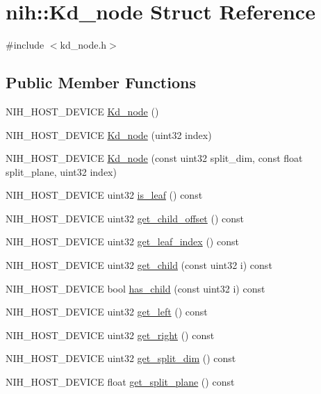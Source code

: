 \hypertarget{structnih_1_1_kd__node}{
\section{nih\-:\-:\-Kd\-\_\-node \-Struct \-Reference}
\label{structnih_1_1_kd__node}
}


{\ttfamily \#include $<$kd\-\_\-node.\-h$>$}

\subsection*{\-Public \-Member \-Functions}
\begin{DoxyCompactItemize}
\item 
\-N\-I\-H\-\_\-\-H\-O\-S\-T\-\_\-\-D\-E\-V\-I\-C\-E \hyperlink{structnih_1_1_kd__node_a2149c53ad7cc826957f69cc02e3ab09f}{\-Kd\-\_\-node} ()
\item 
\-N\-I\-H\-\_\-\-H\-O\-S\-T\-\_\-\-D\-E\-V\-I\-C\-E \hyperlink{structnih_1_1_kd__node_a1829b381799c337fcca40dba470f3e7f}{\-Kd\-\_\-node} (uint32 index)
\item 
\-N\-I\-H\-\_\-\-H\-O\-S\-T\-\_\-\-D\-E\-V\-I\-C\-E \hyperlink{structnih_1_1_kd__node_a2111cebdc9346b36aff1c9d5fbe7d735}{\-Kd\-\_\-node} (const uint32 split\-\_\-dim, const float split\-\_\-plane, uint32 index)
\item 
\-N\-I\-H\-\_\-\-H\-O\-S\-T\-\_\-\-D\-E\-V\-I\-C\-E uint32 \hyperlink{structnih_1_1_kd__node_a25619b385e5688f1016f2959d35653df}{is\-\_\-leaf} () const 
\item 
\-N\-I\-H\-\_\-\-H\-O\-S\-T\-\_\-\-D\-E\-V\-I\-C\-E uint32 \hyperlink{structnih_1_1_kd__node_a119a19feb6758c6b1259e65d9976cc67}{get\-\_\-child\-\_\-offset} () const 
\item 
\-N\-I\-H\-\_\-\-H\-O\-S\-T\-\_\-\-D\-E\-V\-I\-C\-E uint32 \hyperlink{structnih_1_1_kd__node_a9168dcc8e7e8357edbf5fbfea0a665f7}{get\-\_\-leaf\-\_\-index} () const 
\item 
\-N\-I\-H\-\_\-\-H\-O\-S\-T\-\_\-\-D\-E\-V\-I\-C\-E uint32 \hyperlink{structnih_1_1_kd__node_aa4c26fb83061a5527300444cc3d60f58}{get\-\_\-child} (const uint32 i) const 
\item 
\-N\-I\-H\-\_\-\-H\-O\-S\-T\-\_\-\-D\-E\-V\-I\-C\-E bool \hyperlink{structnih_1_1_kd__node_adef1d7ddfa71dda74749f2b516a2d01b}{has\-\_\-child} (const uint32 i) const 
\item 
\-N\-I\-H\-\_\-\-H\-O\-S\-T\-\_\-\-D\-E\-V\-I\-C\-E uint32 \hyperlink{structnih_1_1_kd__node_ae4206521a0b72d8e780dc0cfd68d6a9d}{get\-\_\-left} () const 
\item 
\-N\-I\-H\-\_\-\-H\-O\-S\-T\-\_\-\-D\-E\-V\-I\-C\-E uint32 \hyperlink{structnih_1_1_kd__node_a455e441bda3ae8cef4de37478fd1d911}{get\-\_\-right} () const 
\item 
\-N\-I\-H\-\_\-\-H\-O\-S\-T\-\_\-\-D\-E\-V\-I\-C\-E uint32 \hyperlink{structnih_1_1_kd__node_a0606ab5dcae48dc967ec02944603c90f}{get\-\_\-split\-\_\-dim} () const 
\item 
\-N\-I\-H\-\_\-\-H\-O\-S\-T\-\_\-\-D\-E\-V\-I\-C\-E float \hyperlink{structnih_1_1_kd__node_a31fefd59332fd83af66d842f64a98237}{get\-\_\-split\-\_\-plane} () const 
\end{DoxyCompactItemize}
